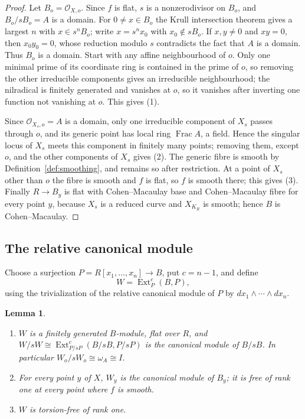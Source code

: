 \documentclass{amsart}
\newtheorem{lemma}[theorem]{Lemma}
\theoremstyle{definition}
\theoremstyle{remark}
\numberwithin{equation}{section}
\DeclareMathOperator{\Ext}{Ext}
\DeclareMathOperator{\Frac}{Frac}
\begin{document}
\begin{proof}
Let $B_o=\mathcal O_{X,o}$. Since $f$ is flat, $s$ is a nonzerodivisor on $B_o$, and $B_o/sB_o=A$ is a domain. For $0\ne x\in B_o$ the Krull intersection theorem gives a largest $n$ with $x\in s^nB_o$; write $x=s^nx_0$ with $x_0\notin sB_o$. If $x,y\ne0$ and $xy=0$, then $x_0y_0=0$, whose reduction modulo $s$ contradicts the fact that $A$ is a domain. Thus $B_o$ is a domain. Start with any affine neighbourhood of $o$. Only one minimal prime of its coordinate ring is contained in the prime of $o$, so removing the other irreducible components gives an irreducible neighbourhood; the nilradical is finitely generated and vanishes at $o$, so it vanishes after inverting one function not vanishing at $o$. This gives (1).

Since $\mathcal O_{X_s,o}=A$ is a domain, only one irreducible component of $X_s$ passes through $o$, and its generic point has local ring $\Frac A$, a field. Hence the singular locus of $X_s$ meets this component in finitely many points; removing them, except $o$, and the other components of $X_s$ gives (2). The generic fibre is smooth by Definition~\ref{def:smoothing}, and remains so after restriction. At a point of $X_s$ other than $o$ the fibre is smooth and $f$ is flat, so $f$ is smooth there; this gives (3). Finally $R\to B_y$ is flat with Cohen--Macaulay base and Cohen--Macaulay fibre for every point $y$, because $X_s$ is a reduced curve and $X_{K_R}$ is smooth; hence $B$ is Cohen--Macaulay.
\end{proof}

\subsection{The relative canonical module}
Choose a surjection $P=R[x_1,\dots,x_n]\to B$, put $c=n-1$, and define
\begin{equation}\label{eq:W}
W=\Ext^{c}_P(B,P),
\end{equation}
using the trivialization of the relative canonical module of $P$ by $dx_1\wedge\cdots\wedge dx_n$.

\begin{lemma}\label{lem:relcan}
\begin{enumerate}
\item $W$ is a finitely generated $B$-module, flat over $R$, and $W/sW\cong\Ext^c_{P/sP}(B/sB,P/sP)$ is the canonical module of $B/sB$. In particular $W_o/sW_o\cong\omega_A\cong I$.
\item For every point $y$ of $X$, $W_y$ is the canonical module of $B_y$; it is free of rank one at every point where $f$ is smooth.
\item $W$ is torsion-free of rank one.
\end{enumerate}
\end{lemma}
\end{document}
